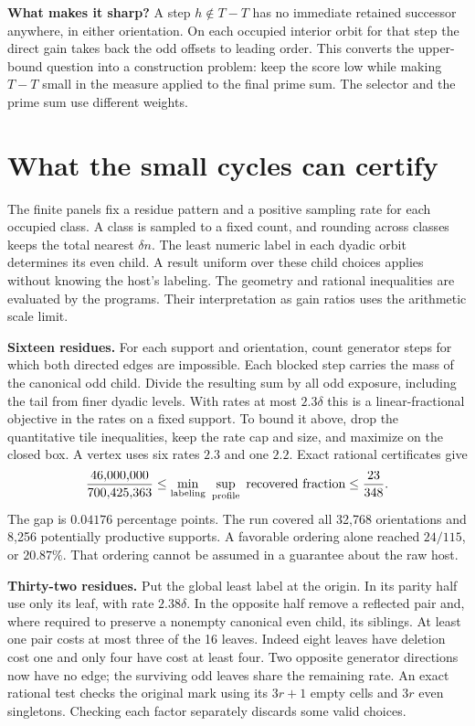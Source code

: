 \documentclass[12pt,letterpaper]{article}
\newcommand{\para}[1]{\par\medskip\noindent\textbf{#1}\quad}
\newcommand{\pagepart}[1]{\clearpage\section{#1}}
\begin{document}
\para{What makes it sharp?} A step \(h\notin T-T\) has no immediate retained successor anywhere, in either orientation. On each occupied interior orbit for that step the direct gain takes back the odd offsets to leading order. This converts the upper-bound question into a construction problem: keep the score low while making \(T-T\) small in the measure applied to the final prime sum. The selector and the prime sum use different weights.

\pagepart{What the small cycles can certify}
The finite panels fix a residue pattern and a positive sampling rate for each occupied class. A class is sampled to a fixed count, and rounding across classes keeps the total nearest \(\delta n\). The least numeric label in each dyadic orbit determines its even child. A result uniform over these child choices applies without knowing the host's labeling. The geometry and rational inequalities are evaluated by the programs. Their interpretation as gain ratios uses the arithmetic scale limit.

\para{Sixteen residues.} For each support and orientation, count generator steps for which both directed edges are impossible. Each blocked step carries the mass of the canonical odd child. Divide the resulting sum by all odd exposure, including the tail from finer dyadic levels. With rates at most \(2.3\delta\) this is a linear-fractional objective in the rates on a fixed support. To bound it above, drop the quantitative tile inequalities, keep the rate cap and size, and maximize on the closed box. A vertex uses six rates \(2.3\) and one \(2.2\). Exact rational certificates give
\[
 \frac{46{,}000{,}000}{700{,}425{,}363}\le
 \min_{\rm labeling}\ \sup_{\rm profile}\ \text{recovered fraction}
 \le\frac{23}{348}.
\]
The gap is \(0.04176\) percentage points. The run covered all 32,768 orientations and 8,256 potentially productive supports. A favorable ordering alone reached \(24/115\), or \(20.87\%\). That ordering cannot be assumed in a guarantee about the raw host.

\para{Thirty-two residues.} Put the global least label at the origin. In its parity half use only its leaf, with rate \(2.38\delta\). In the opposite half remove a reflected pair and, where required to preserve a nonempty canonical even child, its siblings. At least one pair costs at most three of the 16 leaves. Indeed eight leaves have deletion cost one and only four have cost at least four. Two opposite generator directions now have no edge; the surviving odd leaves share the remaining rate. An exact rational test checks the original mark using its \(3r+1\) empty cells and \(3r\) even singletons. Checking each factor separately discards some valid choices.
\end{document}
